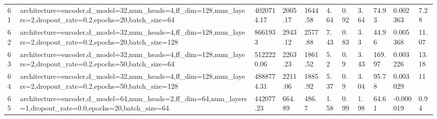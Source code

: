 \begin{longtable}{C{0.8cm} L{2cm} C{1.15cm} C{1.15cm} C{1.15cm} C{1.15cm} C{0.85cm} C{1.25cm} C{1.2cm} C{1.5cm} C{1.0cm}}
61 & architecture=encoder,\newline d\_model=32,\newline num\_heads=4,\newline ff\_dim=128,\newline num\_layers=2,\newline dropout\_rate=0.2,\newline epochs=20,\newline batch\_size=64 & 4020714.17 & 2005.17 & 1644.58 & 4.64 & 0.92 & 3.64 & 74.93 & 0.002363 & 7.28 \\
62 & architecture=encoder,\newline d\_model=32,\newline num\_heads=4,\newline ff\_dim=128,\newline num\_layers=2,\newline dropout\_rate=0.2,\newline epochs=20,\newline batch\_size=128 & 8661933 & 2943.12 & 2577.88 & 7.43 & 0.83 & 3.3 & 44.96 & 0.005368 & 11.07 \\
63 & architecture=encoder,\newline d\_model=32,\newline num\_heads=4,\newline ff\_dim=128,\newline num\_layers=2,\newline dropout\_rate=0.2,\newline epochs=50,\newline batch\_size=64 & 5122220.06 & 2263.23 & 1861.52 & 5.2 & 0.9 & 3.43 & 169.97 & 0.003226 & 13.18 \\
64 & architecture=encoder,\newline d\_model=32,\newline num\_heads=4,\newline ff\_dim=128,\newline num\_layers=2,\newline dropout\_rate=0.2,\newline epochs=50,\newline batch\_size=128 & 4888774.31 & 2211.06 & 1885.92 & 5.37 & 0.9 & 3.04 & 95.78 & 0.003029 & 11 \\
65 & architecture=encoder,\newline d\_model=64,\newline num\_heads=2,\newline ff\_dim=64,\newline num\_layers=1,\newline dropout\_rate=0.0,\newline epochs=20,\newline batch\_size=64 & 442077.23 & 664.89 & 486.7 & 1.58 & 0.99 & 1.98 & 64.61 & -0.000019 & 0.94 \\

\end{longtable}
